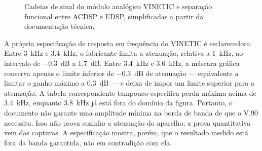 \documentclass[12pt,a4paper]{article}
\begin{document}
\begin{figure}[htbp]
\centering
{}
\caption{Cadeias de sinal do módulo analógico VINETIC e separação funcional entre
ACDSP e EDSP, simplificadas a partir da documentação técnica.}
\label{fig:vinetic-chain}
\end{figure}

A própria especificação de resposta em frequência do VINETIC é esclarecedora. Entre
\SI{3}{kHz} e \SI{3.4}{kHz}, o fabricante limita a atenuação, relativa a
\SI{1}{kHz}, ao intervalo de \SI{-0.3}{dB} a \SI{1.7}{dB}. Entre
\SI{3.4}{kHz} e \SI{3.6}{kHz}, a máscara gráfica conserva apenas o limite inferior
de \SI{-0.3}{dB} de atenuação --- equivalente a limitar o ganho máximo a
\SI{0.3}{dB} --- e deixa de impor um limite superior para a atenuação. A tabela
correspondente tampouco especifica perda máxima acima de \SI{3.4}{kHz}, enquanto
\SI{3.8}{kHz} já está fora do domínio da figura. Portanto, o documento não garante
uma amplitude mínima na borda de banda de que o V.90 necessita. Isso não prova
sozinho a atenuação do aparelho; a prova quantitativa vem das capturas. A
especificação mostra, porém, que o resultado medido está fora da banda garantida,
não em contradição com ela.
\end{document}
